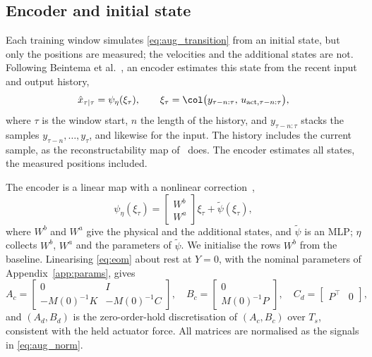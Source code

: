 \subsection{Encoder and initial state}\label{sec:aug_encoder}
Each training window simulates \eqref{eq:aug_transition} from an initial
state, but only the positions are measured; the velocities and the
additional states are not.
Following Beintema et al.~\cite{beintema2023subnet}, an encoder estimates
this state from the recent input and output history,
\begin{equation}
 \hat x_{\tau|\tau}
 =\psi_\eta(\xi_\tau),\qquad
 \xi_\tau=\col\bigl(y_{\tau-n:\tau},\,u_{\mathrm{act},\tau-n:\tau}\bigr),
 \label{eq:aug_encoder}
\end{equation}
where $\tau$ is the window start, $n$ the length of the history, and
$y_{\tau-n:\tau}$ stacks the samples $y_{\tau-n},\dots,y_\tau$, and likewise
for the input.
The history includes the current sample, as the reconstructability map
of~\cite[Eq.~(15)]{hoekstra2026encoder} does.
The encoder estimates all states, the measured positions included.

The encoder is a linear map with a nonlinear
correction~\cite[Eq.~(8)]{hoekstra2026encoder},
\begin{equation}
 \psi_\eta(\xi_\tau)
 =\begin{bmatrix}W^b\\ W^a\end{bmatrix}\xi_\tau+\tilde\psi(\xi_\tau),
 \label{eq:aug_enc_lin}
\end{equation}
where $W^b$ and $W^a$ give the physical and the additional states, and
$\tilde\psi$ is an MLP; $\eta$ collects $W^b$, $W^a$ and the parameters of
$\tilde\psi$.
We initialise the rows $W^b$ from the baseline.
Linearising \eqref{eq:eom} about rest at $Y=0$, with the nominal parameters
of Appendix~\ref{app:params}, gives
\begin{equation}
 A_c=\begin{bmatrix}0 & I\\ -M(0)^{-1}K & -M(0)^{-1}C\end{bmatrix},\quad
 B_c=\begin{bmatrix}0\\ M(0)^{-1}P\end{bmatrix},\quad
 C_d=\begin{bmatrix}P^\top & 0\end{bmatrix},
 \label{eq:aug_lin}
\end{equation}
and $(A_d,B_d)$ is the zero-order-hold discretisation of $(A_c,B_c)$ over
$T_s$, consistent with the held actuator force.
All matrices are normalised as the signals in \eqref{eq:aug_norm}.

